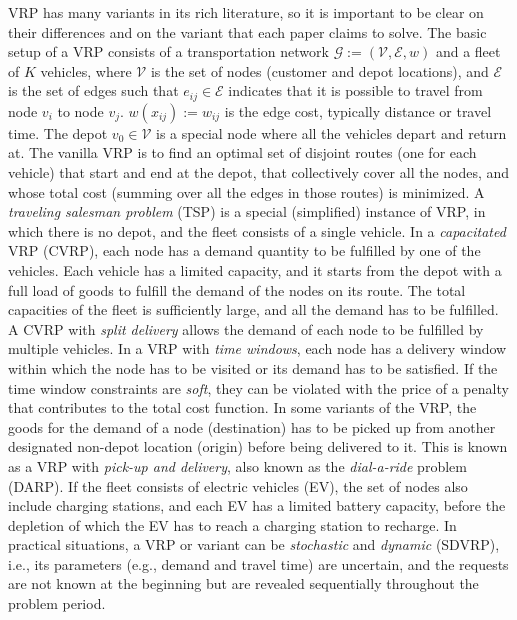 \documentclass{article}
\begin{document}
VRP has many variants in its rich literature, so it is important to be clear on their differences and on the variant that each paper claims to solve. The basic setup of a VRP consists of a transportation network $\mathcal{G}:=(\mathcal{V},\mathcal{E},w)$ and a fleet of $K$ vehicles, where $\mathcal{V}$ is the set of nodes (customer and depot locations), and $\mathcal{E}$ is the set of edges such that $e_{ij} \in \mathcal{E}$ indicates that it is possible to travel from node $v_i$ to node $v_j$. $w(x_{ij}):=w_{ij}$ is the edge cost, typically distance or travel time. The depot $v_0 \in \mathcal{V}$ is a special node where all the vehicles depart and return at. The vanilla VRP is to find an optimal set of disjoint routes (one for each vehicle) that start and end at the depot, that collectively cover all the nodes, and whose total cost (summing over all the edges in those routes) is minimized. A \emph{traveling salesman problem} (TSP) is a special (simplified) instance of VRP, in which there is no depot, and the fleet consists of a single vehicle. In a \emph{capacitated} VRP (CVRP), each node has a demand quantity to be fulfilled by one of the vehicles. Each vehicle has a limited capacity, and it starts from the depot with a full load of goods to fulfill the demand of the nodes on its route. The total capacities of the fleet is sufficiently large, and all the demand has to be fulfilled. A CVRP with \emph{split delivery} allows the demand of each node to be fulfilled by multiple vehicles. In a VRP with \emph{time windows}, each node has a delivery window within which the node has to be visited or its demand has to be satisfied. If the time window constraints are \emph{soft}, they can be violated with the price of a penalty that contributes to the total cost function. In some variants of the VRP, the goods for the demand of a node (destination) has to be picked up from another designated non-depot location (origin) before being delivered to it. This is known as a VRP with \emph{pick-up and delivery}, also known as the \emph{dial-a-ride} problem (DARP). If the fleet consists of electric vehicles (EV), the set of nodes also include charging stations, and each EV has a limited battery capacity, before the depletion of which the EV has to reach a charging station to recharge. In practical situations, a VRP or variant can be \emph{stochastic} and \emph{dynamic} (SDVRP), i.e., its parameters (e.g., demand and travel time) are uncertain, and the requests are not known at the beginning but are revealed sequentially throughout the problem period. 
\end{document}
